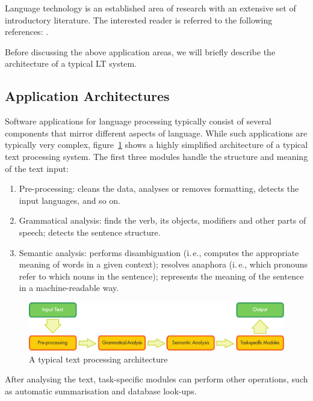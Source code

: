 \begin{multicols}{2}
Language technology is an established area of research with an extensive set of introductory literature. The interested reader is referred to the following references: \cite{boo6, boo7, boo8, str37, boo9}.

Before discussing the above application areas, we will briefly describe the architecture of a typical LT system.

\subsection{Application Architectures}

Software applications for language processing typically consist of several components that mirror different aspects of language. While such applications are typically very complex, figure~\ref{fig:textprocessingarch_en} shows a highly simplified architecture of a typical text processing system. The first three modules handle the structure and meaning of the text input:

\begin{enumerate}
\item Pre-processing: cleans the data, analyses or removes formatting, detects the input languages, and so on.
\item Grammatical analysis: finds the verb, its objects, modifiers and other parts of speech; detects the sentence structure.
\item Semantic analysis: performs disambiguation (i.\,e., computes the appropriate meaning of words in a given context); resolves anaphora (i.\,e., which pronouns refer to which nouns in the sentence); represents the meaning of the sentence in a machine-readable way.
\end{enumerate}

\begin{figure}[b]
  \center
  \includegraphics[width=\textwidth]{../_media/english/text_processing_app_architecture}
  \caption{A typical text processing architecture}
  \label{fig:textprocessingarch_en}
\end{figure}

After analysing the text, task-specific modules can perform other operations, such as automatic summarisation and database look-ups.


\end{multicols}
